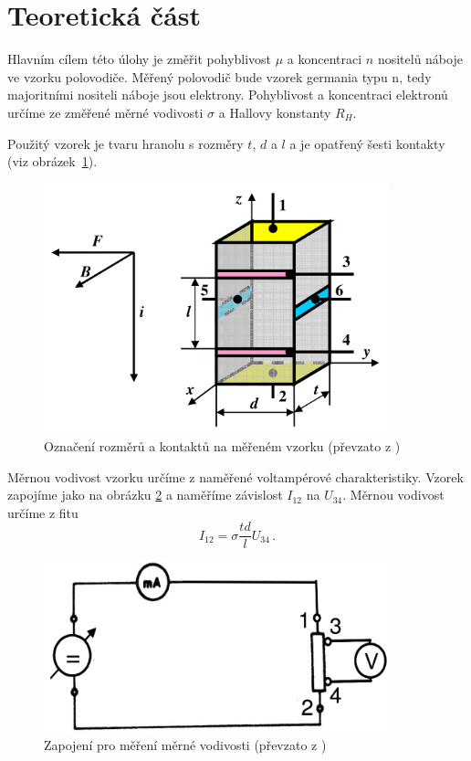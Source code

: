 \section*{Teoretická část}

Hlavním cílem této úlohy je změřit pohyblivost $\mu$ a koncentraci $n$ nositelů náboje ve vzorku polovodiče.
Měřený polovodič bude vzorek germania typu n, tedy majoritními nositeli náboje jsou elektrony.
Pohyblivost a koncentraci elektronů určíme ze změřené měrné vodivosti $\sigma$ a Hallovy konstanty $R_H$.

Použitý vzorek je tvaru hranolu s rozměry $t$, $d$ a $l$ a je opatřený šesti kontakty (viz obrázek~\ref{obr:vzorek}).

\begin{figure}[htbp]
\centering
\includegraphics[width=100mm,scale=0.5]{graficos/vzorek}
\caption{Označení rozměrů a kontaktů na měřeném vzorku (převzato z \cite{skripta})}
\label{obr:vzorek}
\end{figure}

Měrnou vodivost vzorku určíme z naměřené voltampérové charakteristiky.
Vzorek zapojíme jako na obrázku \ref{obr:schemaodpor} a naměříme závislost $I_{12}$ na $U_{34}$.
Měrnou vodivost určíme z fitu
\begin{equation}
I_{12}=\sigma \frac{td}{l} U_{34} \,.
\end{equation}

\begin{figure}[htbp]
\centering
\includegraphics[width=100mm, scale=0.5]{graficos/schema}
\caption{Zapojení pro měření měrné vodivosti (převzato z \cite{skripta})}
\label{obr:schemaodpor}
\end{figure}

